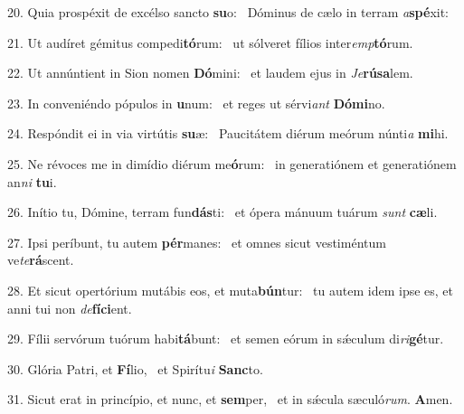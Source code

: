 20. Quia prospéxit de excélso sancto \textbf{su}o: \ast\  Dóminus de cælo in terram \textit{a}\textbf{spé}xit:\

21. Ut audíret gémitus compedi\textbf{tó}rum: \ast\  ut sólveret fílios inter\textit{emp}\textbf{tó}rum.\

22. Ut annúntient in Sion nomen \textbf{Dó}mini: \ast\  et laudem ejus in \textit{Je}\textbf{rú}\textbf{sa}lem.\

23. In conveniéndo pópulos in \textbf{u}num: \ast\  et reges ut sérvi\textit{ant} \textbf{Dó}\textbf{mi}no.\

24. Respóndit ei in via virtútis \textbf{su}æ: \ast\  Paucitátem diérum meórum núnti\textit{a} \textbf{mi}hi.\

25. Ne révoces me in dimídio diérum me\textbf{ó}rum: \ast\  in generatiónem et generatiónem an\textit{ni} \textbf{tu}i.\

26. Inítio tu, Dómine, terram fun\textbf{dás}ti: \ast\  et ópera mánuum tuárum \textit{sunt} \textbf{cæ}li.\

27. Ipsi períbunt, tu autem \textbf{pér}manes: \ast\  et omnes sicut vestiméntum ve\textit{te}\textbf{rá}scent.\

28. Et sicut opertórium mutábis eos, et muta\textbf{bún}tur: \ast\  tu autem idem ipse es, et anni tui non \textit{de}\textbf{fí}\textbf{ci}ent.\

29. Fílii servórum tuórum habi\textbf{tá}bunt: \ast\  et semen eórum in sǽculum di\textit{ri}\textbf{gé}tur.\

30. Glória Patri, et \textbf{Fí}lio, \ast\  et Spirítu\textit{i} \textbf{Sanc}to.\

31. Sicut erat in princípio, et nunc, et \textbf{sem}per, \ast\  et in sǽcula sæculó\textit{rum}. \textbf{A}men.\

